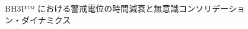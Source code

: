 \begin{figure}[htbp]
  \centering
  \resizebox{0.92\linewidth}{!}{%
  }
  \caption{BH3P™ における警戒電位の時間減衰と無意識コンソリデーション・ダイナミクス}
  \label{fig:bh3p_temporal_decay}
\end{figure}


